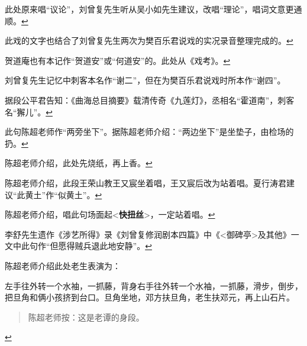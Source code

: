 \item
  \leavevmode\hypertarget{fn297}{}%
  此处原来唱``议论''，刘曾复先生听从吴小如先生建议，改唱``理论''，唱词文意更通顺。\protect\hyperlink{fnref297}{↩}
\item
  \leavevmode\hypertarget{fn298}{}%
  此戏的文字也结合了刘曾复先生两次为樊百乐君说戏的实况录音整理完成的。\protect\hyperlink{fnref298}{↩}
\item
  \leavevmode\hypertarget{fn299}{}%
  贺道庵也有本记作``贺道安''或``何道安''的。此处从《戏考》。\protect\hyperlink{fnref299}{↩}
\item
  \leavevmode\hypertarget{fn300}{}%
  刘曾复先生记忆中刺客本名作``谢二''，但在为樊百乐君说戏时所本作``谢四''。

  据段公平君告知：《曲海总目摘要》载清传奇《九莲灯》，丞相名``霍道南''，刺客名``獬儿''。\protect\hyperlink{fnref300}{↩}
\item
  \leavevmode\hypertarget{fn301}{}%
  此句陈超老师作``两旁坐下''。据陈超老师介绍：``两边坐下''是坐垫子，由检场的扔。\protect\hyperlink{fnref301}{↩}
\item
  \leavevmode\hypertarget{fn302}{}%
  陈超老师介绍，此处先烧纸，再上香。\protect\hyperlink{fnref302}{↩}
\item
  \leavevmode\hypertarget{fn303}{}%
  陈超老师介绍，此段王荣山教王又宸坐着唱，王又宸后改为站着唱。夏行涛君建议``此黄土''作``似黄土''。\protect\hyperlink{fnref303}{↩}
\item
  \leavevmode\hypertarget{fn304}{}%
  陈超老师介绍，唱此句场面起\textless{}\textbf{快扭丝}\textgreater{}，一定站着唱。\protect\hyperlink{fnref304}{↩}
\item
  \leavevmode\hypertarget{fn305}{}%
  李舒先生遗作《涉艺所得》录《刘曾复修润剧本四篇》中《\textless{}御碑亭\textgreater{}及其他》一文中此句作``但愿得贼兵退此地安静''。\protect\hyperlink{fnref305}{↩}
\item
  \leavevmode\hypertarget{fn306}{}%
  陈超老师介绍此处老生表演为：

  左手往外转一个水袖，一抓藤，背身右手往外转一个水袖，一抓藤，滑步，倒步，把旦角和俩小孩挤到台口。旦角坐地，邓方扶旦角，老生扶邓元，再上山石片。

  \begin{quote}
  陈超老师按：这是老谭的身段。
  \end{quote}

  \protect\hyperlink{fnref306}{↩}

